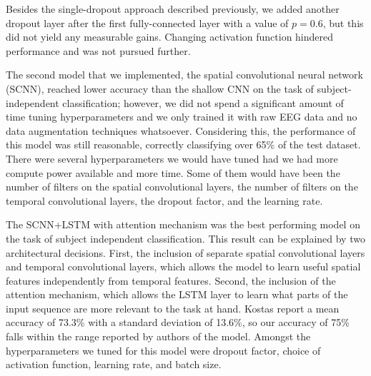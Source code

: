 \documentclass[10pt,twocolumn,letterpaper]{article}
\begin{document}
Besides the single-dropout approach described previously, we added another dropout layer after the first fully-connected layer with a
value of $p=0.6$, but this did not yield any measurable gains. Changing activation function hindered performance and was not pursued further.


The second model that we implemented, the spatial convolutional neural network
(SCNN), reached lower accuracy than the shallow CNN on the task of
subject-independent classification; however, we did not spend a significant
amount of time tuning hyperparameters and we only trained it with raw EEG data
and no data augmentation techniques whatsoever.
Considering this, the performance of this model was still reasonable, correctly
classifying over 65\% of the test dataset.
There were several hyperparameters we would have tuned had we had more compute
power available and more time. Some of them would have been the number of
filters on the spatial convolutional layers, the number of filters on the
temporal convolutional layers, the dropout factor, and the learning rate.

The SCNN+LSTM with attention mechanism was the best performing model on the task
of subject independent classification. 
This result can be explained by two architectural decisions. 
First, the inclusion of separate spatial convolutional layers and temporal
convolutional layers, which allows the model to learn useful spatial features
independently from temporal features. 
Second, the inclusion of the attention mechanism, which allows the LSTM layer to
learn what parts of the input sequence are more relevant to the task at hand. 
Kostas \etal \cite{kostas2019machine} report a mean accuracy of 73.3\% with a
standard deviation of 13.6\%, so our accuracy of 75\% falls within the range
reported by authors of the model.
Amongst the hyperparameters we tuned for this model were dropout factor, choice
of activation function, learning rate, and batch size.

{\small


}
\end{document}
